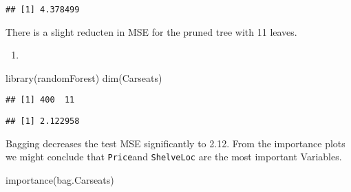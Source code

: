 \documentclass[
]{article}
\newenvironment{Shaded}{\begin{snugshade}}{\end{snugshade}}
\newcommand{\AttributeTok}[1]{\textcolor[rgb]{0.77,0.63,0.00}{#1}}
\newcommand{\ConstantTok}[1]{\textcolor[rgb]{0.00,0.00,0.00}{#1}}
\newcommand{\DecValTok}[1]{\textcolor[rgb]{0.00,0.00,0.81}{#1}}
\newcommand{\FunctionTok}[1]{\textcolor[rgb]{0.00,0.00,0.00}{#1}}
\newcommand{\NormalTok}[1]{#1}
\newcommand{\OtherTok}[1]{\textcolor[rgb]{0.56,0.35,0.01}{#1}}
\newcommand{\SpecialCharTok}[1]{\textcolor[rgb]{0.00,0.00,0.00}{#1}}
\providecommand{\tightlist}{%
  \setlength{\itemsep}{0pt}\setlength{\parskip}{0pt}}
\begin{document}
\begin{verbatim}
## [1] 4.378499
\end{verbatim}

There is a slight reducten in MSE for the pruned tree with 11 leaves.

\begin{enumerate}
\def\labelenumi{\alph{enumi})}
\setcounter{enumi}{3}
\tightlist
\item
\end{enumerate}

\begin{Shaded}
\begin{Highlighting}[]
\FunctionTok{library}\NormalTok{(randomForest)}
\FunctionTok{dim}\NormalTok{(Carseats)}
\end{Highlighting}
\end{Shaded}

\begin{verbatim}
## [1] 400  11
\end{verbatim}

\begin{Shaded}
\end{Shaded}

\begin{verbatim}
## [1] 2.122958
\end{verbatim}

Bagging decreases the test MSE significantly to 2.12. From the
importance plots we might conclude that \texttt{Price}and
\texttt{ShelveLoc} are the most important Variables.

\begin{Shaded}
\begin{Highlighting}[]
\FunctionTok{importance}\NormalTok{(bag.Carseats)}
\end{Highlighting}
\end{Shaded}
\end{document}
